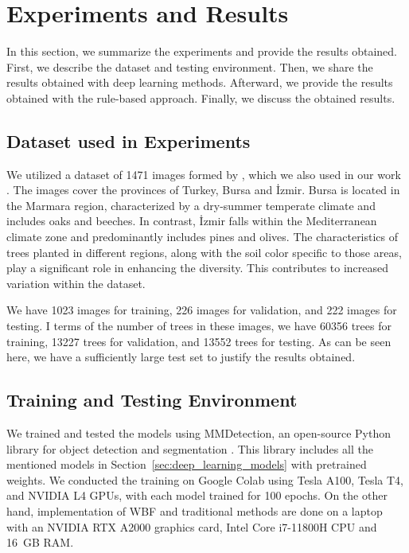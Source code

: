 \documentclass{article}
\begin{document}
\section{Experiments and Results}

In this section, we summarize the experiments and provide the results obtained. First, we describe the dataset and testing environment. Then, we share the results obtained with deep learning methods. Afterward, we provide the results obtained with the rule-based approach. Finally, we discuss the obtained results.

\subsection{Dataset used in Experiments}

We utilized a dataset of 1471 images formed by \cite{10.3389/ffgc.2024.1495544}, which we also used in our work \cite{durgut2025multi}. The images cover the provinces of Turkey, Bursa and İzmir. Bursa is located in the Marmara region, characterized by a dry-summer temperate climate and includes oaks and beeches. In contrast, İzmir falls within the Mediterranean climate zone and predominantly includes pines and olives. The characteristics of trees planted in different regions, along with the soil color specific to those areas, play a significant role in enhancing the diversity. This contributes to increased variation within the dataset. 

We have 1023 images for training, 226 images for validation, and 222 images for testing. I terms of the number of trees in these images, we have 60356 trees for training, 13227 trees for validation, and 13552 trees for testing. As can be seen here, we have a sufficiently large test set to justify the results obtained.

\subsection{Training and Testing Environment}

We trained and tested the models using MMDetection, an open-source Python library for object detection and segmentation \cite{chen2019mmdetection}. This library includes all the mentioned models in Section~\ref{sec:deep_learning_models} with pretrained weights. We conducted the training on Google Colab using Tesla A100, Tesla T4, and NVIDIA L4 GPUs, with each model trained for 100 epochs. On the other hand, implementation of WBF and traditional methods are done on a laptop with an NVIDIA RTX A2000 graphics card, Intel Core i7-11800H CPU and 16~GB RAM.
\end{document}
